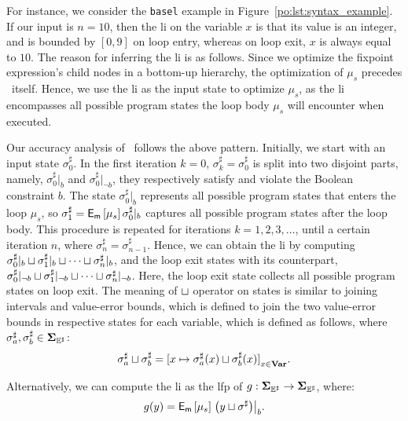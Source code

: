 For instance, we consider the \verb|basel| example in
Figure~\ref{po:lst:syntax_example}.  If our input is $n = 10$, then the
\gls{li} on the variable $x$ is that its value is an integer, and is bounded
by $[0, 9]$ on loop entry, whereas on loop exit, $x$ is always equal to $10$.
The reason for inferring the \gls{li} is as follows.  Since we optimize the
fixpoint expression's child nodes in a bottom-up hierarchy, the optimization of
$\mu_s$ precedes \fixexprmir~itself.  Hence, we use the \gls{li} as the input
state to optimize $\mu_s$, as the \gls{li} encompasses all possible program
states the loop body $\mu_s$ will encounter when executed.

Our accuracy analysis of \fixexprmir~follows the above pattern.  Initially,
we start with an input state $\sigma^\sharp_0$.  In the first iteration
$k = 0$, $\sigma^\sharp_k = \sigma^\sharp_0$ is split into two disjoint
parts, namely, $\sigma^\sharp_0|_b$ and $\sigma^\sharp_0|_{\neg b}$, they
respectively satisfy and violate the Boolean constraint $b$.  The state
$\sigma^\sharp_0|_b$ represents all possible program states that enters the
loop $\mu_s$, so $\sigma^\sharp_1 = \operatorname{\mathsf{E}_\mathsf{m}}\left[{\mu_s}\right]{\sigma^\sharp_0|_b}$
captures all possible program states after the loop body.  This procedure
is repeated for iterations $k = 1, 2, 3, \ldots$, until a certain iteration
$n$, where $\sigma^\sharp_n = \sigma^\sharp_{n-1}$.  Hence, we can obtain the
\gls{li} by computing $\sigma^\sharp_0|_b \sqcup \sigma^\sharp_1|_b \sqcup \cdots
\sqcup \sigma^\sharp_n|_b$, and the loop exit states with its counterpart,
\ie~$\sigma^\sharp_0|_{\neg b} \sqcup \sigma^\sharp_1|_{\neg b} \sqcup \cdots
\sqcup \sigma^\sharp_n|_{\neg b}$.  Here, the loop exit state collects all
possible program states on loop exit.  The meaning of $\sqcup$ operator on
states is similar to joining intervals and value-error bounds, which is defined
to join the two value-error bounds in respective states for each variable,
which is defined as follows, where $\sigma^\sharp_a, \sigma^\sharp_b \in
\mathbf{\Sigma}_{\mathbb{E}^\sharp}$:
\begin{equation}
    \sigma^\sharp_a \join \sigma^\sharp_b =
        {%
            [ x \mapsto \sigma^\sharp_a(x) \join \sigma^\sharp_b(x) ]
        }_{x \in \varset}.
\end{equation}

Alternatively, we can compute the \gls{li} as the \gls{lfp} of $g: \mathbf{\Sigma}_{\mathbb{E}^\sharp}
\to \mathbf{\Sigma}_{\mathbb{E}^\sharp}$, where:
\begin{equation}
    g(y) = \operatorname{\mathsf{E}_\mathsf{m}}\left[{\mu_s}\right]{
        \left.\left( y \ensuremath\sqcup\sigma^\sharp \right)\right|_b
    }.
\end{equation}


